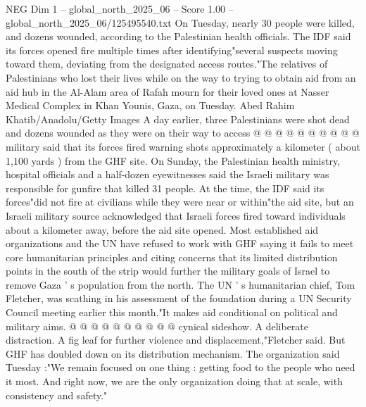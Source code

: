\begin{textsample}{NEG Dim 1 – global\_north\_2025\_06 – Score 1.00 – global\_north\_2025\_06/125495540.txt}
On Tuesday, nearly 30 people were killed, and dozens wounded, according to the Palestinian health officials.
The IDF said its forces opened fire multiple times after identifying"several suspects moving toward them, deviating from the designated access routes."The relatives of Palestinians who lost their lives while on the way to trying to obtain aid from an aid hub in the Al-Alam area of Rafah mourn for their loved ones at Nasser Medical Complex in Khan Younis, Gaza, on Tuesday.
Abed Rahim Khatib/Anadolu/Getty Images A day earlier, three Palestinians were shot dead and dozens wounded as they were on their way to access @ @ @ @ @ @ @ @ @ @ military said that its forces fired warning shots approximately a kilometer ( about 1,100 yards ) from the GHF site.
On Sunday, the Palestinian health ministry, hospital officials and a half-dozen eyewitnesses said the Israeli military was responsible for gunfire that killed 31 people.
At the time, the IDF said its forces"did not fire at civilians while they were near or within"the aid site, but an Israeli military source acknowledged that Israeli forces fired toward individuals about a kilometer away, before the aid site opened.
Most established aid organizations and the UN have refused to work with GHF saying it fails to meet core humanitarian principles and citing concerns that its limited distribution points in the south of the strip would further the military goals of Israel to remove Gaza ' s population from the north.
The UN ' s humanitarian chief, Tom Fletcher, was scathing in his assessment of the foundation during a UN Security Council meeting earlier this month."It makes aid conditional on political and military aims. @ @ @ @ @ @ @ @ @ @ cynical sideshow.
A deliberate distraction.
A fig leaf for further violence and displacement,"Fletcher said.
But GHF has doubled down on its distribution mechanism.
The organization said Tuesday :"We remain focused on one thing : getting food to the people who need it most.
And right now, we are the only organization doing that at scale, with consistency and safety."

\end{textsample}
